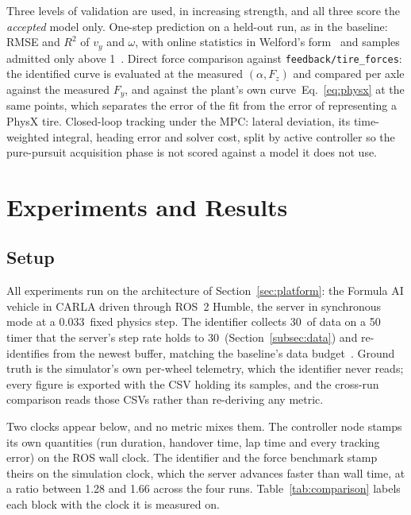 \documentclass[lineno,12pt]{sn-jnl}
\makeatletter
\newif\ifsiu@prev
\DeclareRobustCommand{\siu@sep}{\ifsiu@prev\,\fi}
\DeclareRobustCommand{\siu@unit}[1]{\siu@sep\text{#1}\siu@prevtrue}
\DeclareRobustCommand{\siu@pre}[1]{\siu@sep\text{#1}\siu@prevfalse}
\DeclareRobustCommand{\siu@div}[1]{\text{#1}\siu@prevfalse}
\DeclareRobustCommand{\meter}{m}
\DeclareRobustCommand{\second}{s}
\DeclareRobustCommand{\gram}{g}
\DeclareRobustCommand{\newton}{N}
\DeclareRobustCommand{\radian}{rad}
\DeclareRobustCommand{\hertz}{Hz}
\DeclareRobustCommand{\percent}{\%}
\DeclareRobustCommand{\g}{\textit{g}}
\DeclareRobustCommand{\kilo}{k}
\DeclareRobustCommand{\milli}{m}
\DeclareRobustCommand{\per}{/}
\DeclareRobustCommand{\squared}{\ensuremath{^{2}}}
\providecommand{\degree}{\ensuremath{^{\circ}}}
\DeclareRobustCommand{\si}[1]{\begingroup
  \siu@prevfalse
  \renewcommand{\meter}{\siu@unit{m}}%
  \renewcommand{\second}{\siu@unit{s}}%
  \renewcommand{\gram}{\siu@unit{g}}%
  \renewcommand{\newton}{\siu@unit{N}}%
  \renewcommand{\radian}{\siu@unit{rad}}%
  \renewcommand{\hertz}{\siu@unit{Hz}}%
  \renewcommand{\percent}{\siu@unit{\%}}%
  \renewcommand{\degree}{\siu@unit{\ensuremath{^{\circ}}}}%
  \renewcommand{\g}{\siu@unit{\textit{g}}}%
  \renewcommand{\kilo}{\siu@pre{k}}%
  \renewcommand{\milli}{\siu@pre{m}}%
  \renewcommand{\per}{\siu@div{/}}%
  \renewcommand{\squared}{\ensuremath{^{2}}}%
  #1\endgroup}
\DeclareRobustCommand{\num}[1]{#1}
\DeclareRobustCommand{\SI}[2]{#1\,\si{#2}}
\theoremstyle{thmstyleone}%
\theoremstyle{thmstyletwo}%
\theoremstyle{thmstylethree}%
\makeatother
\begin{document}
Three levels of validation are used, in increasing strength, and all three score
the \emph{accepted} model only. One-step prediction on a held-out run,
as in the baseline: RMSE and $R^{2}$ of $v_{y}$ and $\omega$, with online
statistics in Welford's form~\cite{welford1962} and samples admitted only above
\SI{1}{\meter\per\second}. Direct force comparison against
\texttt{feedback/\allowbreak tire\_forces}: the identified curve is evaluated at
the measured $(\alpha,F_{z})$ and compared per axle against the measured
$F_{y}$, and against the plant's own curve~Eq.~\eqref{eq:physx} at the same points,
which separates the error of the fit from the error of representing a PhysX
tire. Closed-loop tracking under the MPC: lateral deviation, its
time-weighted integral, heading error and solver cost, split by active
controller so the pure-pursuit acquisition phase is not scored against a model
it does not use.

\section{Experiments and Results}
\label{sec:results}

\subsection{Setup}
\label{subsec:setup}

All experiments run on the architecture of Section~\ref{sec:platform}: the
Formula AI vehicle in CARLA driven through ROS~2 Humble, the server in
synchronous mode at a \SI{0.033}{\second} fixed physics step. The identifier
collects \SI{30}{\second} of data on a \SI{50}{\hertz} timer that the server's
step rate holds to \SI{30}{\hertz} (Section~\ref{subsec:data}) and
re-identifies from the newest buffer, matching the baseline's data
budget~\cite{ontrack2025}. Ground truth is the simulator's own per-wheel
telemetry, which the identifier never reads; every figure is exported with the
CSV holding its samples, and the cross-run comparison reads those CSVs rather
than re-deriving any metric.

Two clocks appear below, and no metric mixes them. The controller node stamps
its own quantities (run duration, handover time, lap time and every tracking
error) on the ROS wall clock. The identifier and the force benchmark stamp
theirs on the simulation clock, which the server advances faster than wall time,
at a ratio between \num{1.28} and \num{1.66} across the four runs. Table~\ref{tab:comparison}
labels each block with the clock it is measured on.
\end{document}

